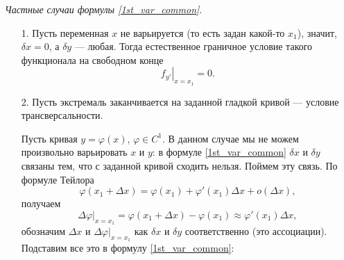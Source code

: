 \documentclass[12pt,a5paper]{book}
\begin{document}
	\vspace*{0.5em}
	\emph{Частные случаи формулы \eqref{1st_var_common}}.
	\begin{itemize}
		\item [1.] Пусть переменная $x$ не варьируется (то есть задан какой-то $x_1$), значит, $\delta x = 0$, а $\delta y$ --- любая. Тогда естественное граничное условие такого функционала на свободном конце
		\begin{equation*}
			\left.f_{y'}\right|_{x=x_1} = 0.
		\end{equation*}
		\item [2.] Пусть экстремаль заканчивается на заданной гладкой кривой --- условие трансверсальности.
		\begin{center}
		\end{center}
		Пусть кривая $y = \varphi(x)$, $\varphi \in C^1$. В данном случае мы не можем произвольно варьировать $x$ и $y$: в формуле \eqref{1st_var_common} $\delta x$ и $\delta y$ связаны тем, что с заданной кривой сходить нельзя. Поймем эту связь. По формуле Тейлора
		\begin{equation*}
			\varphi(x_1 + \Delta x) = \varphi(x_1) + \varphi'(x_1)\Delta x + o(\Delta x),
		\end{equation*}
		получаем
		\begin{equation*}
			\left.\Delta \varphi\right|_{x=x_1} = \varphi(x_1 + \Delta x) - \varphi(x_1) \approx \varphi'(x_1)\Delta x,
		\end{equation*}
		обозначим $\Delta x$ и $\Delta \varphi|_{x=x_1}$ как $\delta x$ и $\delta y$ соответственно (это ассоциации). Подставим все это в формулу \eqref{1st_var_common}:
		\begin{equation*}

\end{equation*}
\end{itemize}
\end{document}
